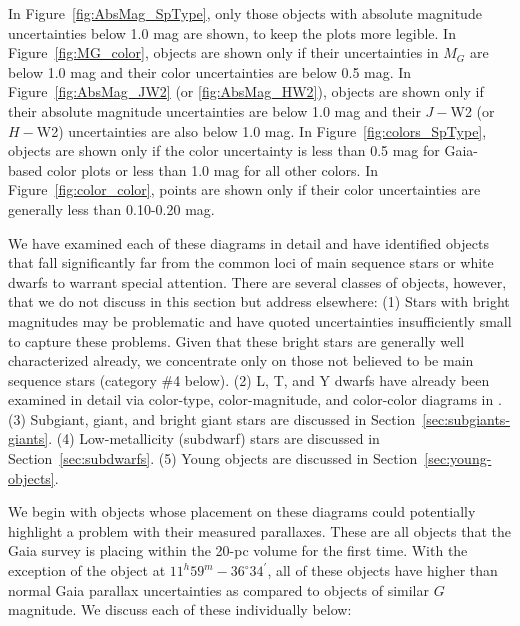 \documentclass[twocolumn,tighten,twocolappendix]{aastex631}
\begin{document}
In Figure~\ref{fig:AbsMag_SpType}, only those objects with absolute magnitude uncertainties below 1.0 mag are shown, to keep the plots more legible. 
In Figure~\ref{fig:MG_color}, objects are shown only if their uncertainties in $M_G$ are below 1.0 mag and their color uncertainties are below 0.5 mag. 
In Figure~\ref{fig:AbsMag_JW2} (or \ref{fig:AbsMag_HW2}), objects are shown only if their absolute magnitude uncertainties are below 1.0 mag and their $J-$W2 (or $H-$W2) uncertainties are also below 1.0 mag.
In Figure~\ref{fig:colors_SpType}, objects are shown only if the color uncertainty is less than 0.5 mag for Gaia-based color plots or less than 1.0 mag for all other colors.
In Figure~\ref{fig:color_color}, points are shown only if their color uncertainties are generally less than 0.10-0.20 mag.

We have examined each of these diagrams in detail and have identified objects that fall significantly far from the common loci of main sequence stars or white dwarfs to warrant special attention. There are several classes of objects, however,  that we do not discuss in this section but address elsewhere: (1) Stars with bright magnitudes may be problematic and have quoted uncertainties insufficiently small to capture these problems. Given that these bright stars are generally well characterized already, we concentrate only on those not believed to be main sequence stars (category \#4 below). (2) L, T, and Y dwarfs have already been examined in detail via color-type, color-magnitude, and color-color diagrams in \cite{kirkpatrick2021}. (3)  Subgiant, giant, and bright giant stars are discussed in Section~\ref{sec:subgiants-giants}. (4) Low-metallicity (subdwarf) stars are discussed in Section~\ref{sec:subdwarfs}. (5) Young objects are discussed in Section~\ref{sec:young-objects}.

We begin with objects whose placement on these diagrams could potentially highlight a problem with their measured parallaxes. These are all objects that the Gaia survey is placing within the 20-pc volume for the first time. With the exception of the object at $11^h59^m-36^{\circ}34^{\prime}$, all of these objects have higher than normal Gaia parallax uncertainties as compared to objects of similar $G$ magnitude. We discuss each of these individually below:
\end{document}
